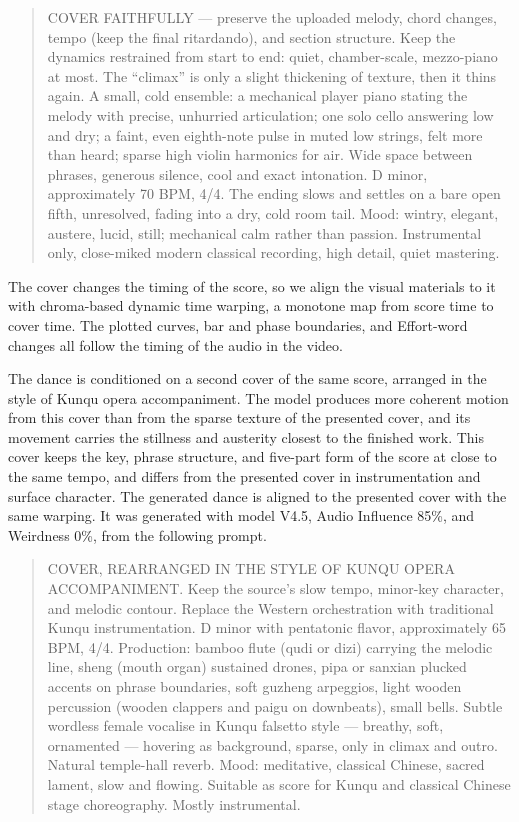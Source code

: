 \begin{quote}
\small
COVER FAITHFULLY --- preserve the uploaded melody, chord changes, tempo
(keep the final ritardando), and section structure. Keep the dynamics
restrained from start to end: quiet, chamber-scale, mezzo-piano at most.
The ``climax'' is only a slight thickening of texture, then it thins again.
A small, cold ensemble: a mechanical player piano stating the melody with
precise, unhurried articulation; one solo cello answering low and dry; a
faint, even eighth-note pulse in muted low strings, felt more than heard;
sparse high violin harmonics for air. Wide space between phrases, generous
silence, cool and exact intonation. D minor, approximately 70 BPM, 4/4.
The ending slows and settles on a bare open fifth, unresolved, fading into
a dry, cold room tail. Mood: wintry, elegant, austere, lucid, still;
mechanical calm rather than passion. Instrumental only, close-miked modern
classical recording, high detail, quiet mastering.
\end{quote}

The cover changes the timing of the score, so we align the visual materials to it with chroma-based dynamic time warping, a monotone map from score time to cover time.
The plotted curves, bar and phase boundaries, and Effort-word changes all follow the timing of the audio in the video.

The dance is conditioned on a second cover of the same score, arranged in the style of Kunqu opera accompaniment.
The model produces more coherent motion from this cover than from the sparse texture of the presented cover, and its movement carries the stillness and austerity closest to the finished work.
This cover keeps the key, phrase structure, and five-part form of the score at close to the same tempo, and differs from the presented cover in instrumentation and surface character.
The generated dance is aligned to the presented cover with the same warping.
It was generated with model V4.5, Audio Influence 85\%, and Weirdness 0\%, from the following prompt.

\begin{quote}
\small
COVER, REARRANGED IN THE STYLE OF KUNQU OPERA ACCOMPANIMENT. Keep the
source's slow tempo, minor-key character, and melodic contour. Replace the
Western orchestration with traditional Kunqu instrumentation. D minor with
pentatonic flavor, approximately 65 BPM, 4/4. Production: bamboo flute (qudi
or dizi) carrying the melodic line, sheng (mouth organ) sustained drones,
pipa or sanxian plucked accents on phrase boundaries, soft guzheng arpeggios,
light wooden percussion (wooden clappers and paigu on downbeats), small bells.
Subtle wordless female vocalise in Kunqu falsetto style --- breathy, soft,
ornamented --- hovering as background, sparse, only in climax and outro.
Natural temple-hall reverb. Mood: meditative, classical Chinese, sacred
lament, slow and flowing. Suitable as score for Kunqu and classical Chinese
stage choreography. Mostly instrumental.
\end{quote}

